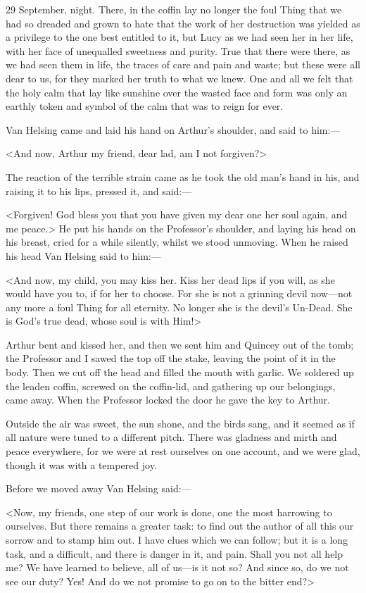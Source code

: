 \begin{diary}{29 September, night.}
There, in the coffin lay no longer the foul Thing that we had so dreaded and grown to hate that the work of her destruction was yielded as a privilege to the one best entitled to it, but Lucy as we had seen her in her life, with her face of unequalled sweetness and purity. True that there were there, as we had seen them in life, the traces of care and pain and waste; but these were all dear to us, for they marked her truth to what we knew. One and all we felt that the holy calm that lay like sunshine over the wasted face and form was only an earthly token and symbol of the calm that was to reign for ever.

Van Helsing came and laid his hand on Arthur's shoulder, and said to him:—

<And now, Arthur my friend, dear lad, am I not forgiven?>

The reaction of the terrible strain came as he took the old man's hand in his, and raising it to his lips, pressed it, and said:—

<Forgiven! God bless you that you have given my dear one her soul again, and me peace.> He put his hands on the Professor's shoulder, and laying his head on his breast, cried for a while silently, whilst we stood unmoving. When he raised his head Van Helsing said to him:—

<And now, my child, you may kiss her. Kiss her dead lips if you will, as she would have you to, if for her to choose. For she is not a grinning devil now—not any more a foul Thing for all eternity. No longer she is the devil's Un-Dead. She is God's true dead, whose soul is with Him!>

Arthur bent and kissed her, and then we sent him and Quincey out of the tomb; the Professor and I sawed the top off the stake, leaving the point of it in the body. Then we cut off the head and filled the mouth with garlic. We soldered up the leaden coffin, screwed on the coffin-lid, and gathering up our belongings, came away. When the Professor locked the door he gave the key to Arthur.

Outside the air was sweet, the sun shone, and the birds sang, and it seemed as if all nature were tuned to a different pitch. There was gladness and mirth and peace everywhere, for we were at rest ourselves on one account, and we were glad, though it was with a tempered joy.

Before we moved away Van Helsing said:—

<Now, my friends, one step of our work is done, one the most harrowing to ourselves. But there remains a greater task: to find out the author of all this our sorrow and to stamp him out. I have clues which we can follow; but it is a long task, and a difficult, and there is danger in it, and pain. Shall you not all help me? We have learned to believe, all of us—is it not so? And since so, do we not see our duty? Yes! And do we not promise to go on to the bitter end?>


\end{diary}
